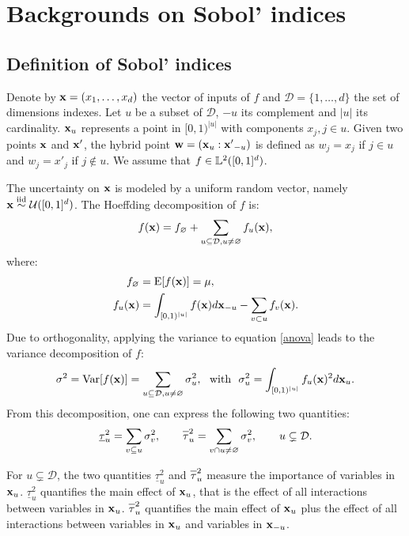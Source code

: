 \section{Backgrounds on Sobol' indices}
\label{sec:2}

\subsection{Definition of Sobol' indices}
\label{sec:2.1}
Denote by $\boldsymbol{\mathbf{x}}=(x_1,\dots,x_d)$ the vector of inputs of $f$ and $\mathcal{D}=\{1,\dots,d\}$ the set of dimensions indexes. %
Let $u$ be a subset of $\mathcal{D}$, $-u$ its complement and $|u|$ its cardinality. $\boldsymbol{\mathbf{x}}_u$ represents a point in $[0,1)^{|u|}$ with components $x_j, j \in u$. Given two points $\boldsymbol{\mathbf{x}}$ and $\boldsymbol{\mathbf{x}}'$, the hybrid point $\boldsymbol{\mathbf{w}}=(\boldsymbol{\mathbf{x}}_u:{\boldsymbol{\mathbf{x}}'}_{-u})$ is defined as $w_j=x_j$ if $j \in u$ and $w_j={x'}_j$ if $j \notin u$. We assume that $f \in \mathbb{L}^2([0,1]^d)$.%

The uncertainty on $\boldsymbol{\mathbf{x}}$ is modeled by a uniform random vector, namely $\boldsymbol{\mathbf{x}} \stackrel{{\rm iid}}{\sim} \mathcal{U}([0,1]^d)$. The Hoeffding decomposition \cite{Hoeffding,Sobol'} of $f$ is:
\begin{equation}
f(\boldsymbol{\mathbf{x}})=f_{\varnothing}+\sum \limits_{u \subseteq \mathcal{D}, u \neq \varnothing} f_u(\boldsymbol{\mathbf{x}}),
\label{anova}
\end{equation}
where:
\begin{align*}
f_{\varnothing} &= \mathrm{E}[f(\boldsymbol{\mathbf{x}})]= \mu, \\
f_u(\boldsymbol{\mathbf{x}}) &= \int_{[0,1)^{|u|}} f(\boldsymbol{\mathbf{x}}) d{\boldsymbol{\mathbf{x}}}_{-u} - \sum \limits_{v \subset u} f_v(\boldsymbol{\mathbf{x}}).
\end{align*}
Due to orthogonality, applying the variance to equation \eqref{anova} leads to the variance decomposition of $f$:
\[ \sigma^2 = \mathrm{Var}[f(\vx)] = \sum \limits_{u \subseteq \mathcal{D}, u \neq \varnothing} \sigma_u^2, \ \text{ with } \ \sigma_u^2=\int_{[0,1)^{|u|}} f_u(\vx)^2 d{\vx_u}.\]
From this decomposition, one can express the following two quantities:
\[\underline{\tau}_u^2 = \sum \limits_{v \subseteq u} \sigma_v^2, \qquad
\ov{$\tau$}_u^2 = \sum \limits_{v \cap u \neq \varnothing} \sigma_v^2, \qquad u \subsetneq \mathcal{D}.\]

For $u \subsetneq \mathcal{D}$, the two quantities $\underline{\tau}_u^2$ and $\ov{$\tau$}_u^2$ measure the importance of variables in $\boldsymbol{\mathbf{x}}_u$. $\underline{\tau}_u^2$ quantifies the main effect of $\boldsymbol{\mathbf{x}}_u$, that is the effect of all interactions between variables in $\boldsymbol{\mathbf{x}}_u$. $\ov{$\tau$}_u^2$ quantifies the main effect of $\boldsymbol{\mathbf{x}}_u$ plus the effect of all interactions between variables in $\boldsymbol{\mathbf{x}}_u$ and variables in $\boldsymbol{\mathbf{x}}_{-u}$.

